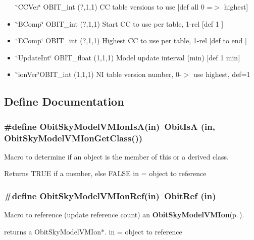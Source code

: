 \begin{itemize}
\char`\"{}CCVer\char`\"{} OBIT\_\-int (?,1,1) CC table versions to use [def all 0 =$>$ highest] \item \char`\"{}BComp\char`\"{} OBIT\_\-int (?,1,1) Start CC to use per table, 1-rel [def 1 ] \item \char`\"{}EComp\char`\"{} OBIT\_\-int (?,1,1) Highest CC to use per table, 1-rel [def to end ] \item \char`\"{}Update\-Int\char`\"{} OBIT\_\-float (1,1,1) Model update interval (min) [def 1 min] \item \char`\"{}ion\-Ver\char`\"{}OBIT\_\-int (1,1,1) NI table version number, 0-$>$ use highest, def=1\end{itemize}


\subsection{Define Documentation}
\subsubsection{\setlength{\rightskip}{0pt plus 5cm}\#define Obit\-Sky\-Model\-VMIon\-Is\-A(in)\ Obit\-Is\-A (in, Obit\-Sky\-Model\-VMIon\-Get\-Class())}\label{ObitSkyModelVMIon_8h_a2}


Macro to determine if an object is the member of this or a derived class. 

Returns TRUE if a member, else FALSE in = object to reference 
\subsubsection{\setlength{\rightskip}{0pt plus 5cm}\#define Obit\-Sky\-Model\-VMIon\-Ref(in)\ Obit\-Ref (in)}\label{ObitSkyModelVMIon_8h_a1}


Macro to reference (update reference count) an {\bf Obit\-Sky\-Model\-VMIon}{\rm (p.\,\pageref{structObitSkyModelVMIon})}. 

returns a Obit\-Sky\-Model\-VMIon$\ast$. in = object to reference 

